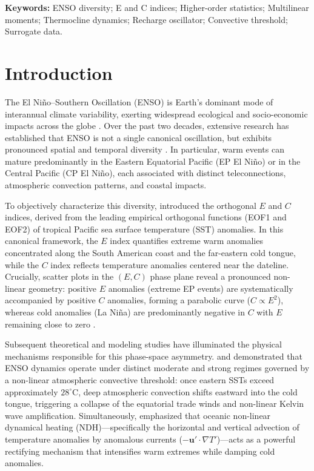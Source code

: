 \documentclass[11pt,a4paper]{article}
\begin{document}
\vspace{0.5em}
\noindent\textbf{Keywords:} ENSO diversity; E and C indices; Higher-order statistics; Multilinear moments; Thermocline dynamics; Recharge oscillator; Convective threshold; Surrogate data.

\vspace{1.0em}

\section{Introduction}

The El Ni\~no--Southern Oscillation (ENSO) is Earth's dominant mode of interannual climate variability, exerting widespread ecological and socio-economic impacts across the globe \citep{rasmusson1982variations, mcphaden1998tropical, cai2021changing}. Over the past two decades, extensive research has established that ENSO is not a single canonical oscillation, but exhibits pronounced spatial and temporal diversity \citep{capotondi2015understanding, timmermann2018enso}. In particular, warm events can mature predominantly in the Eastern Equatorial Pacific (EP El Ni\~no) or in the Central Pacific (CP El Ni\~no), each associated with distinct teleconnections, atmospheric convection patterns, and coastal impacts.

To objectively characterize this diversity, \citet{takahashi2011enso} introduced the orthogonal $E$ and $C$ indices, derived from the leading empirical orthogonal functions (EOF1 and EOF2) of tropical Pacific sea surface temperature (SST) anomalies. In this canonical framework, the $E$ index quantifies extreme warm anomalies concentrated along the South American coast and the far-eastern cold tongue, while the $C$ index reflects temperature anomalies centered near the dateline. Crucially, scatter plots in the $(E, C)$ phase plane reveal a pronounced non-linear geometry: positive $E$ anomalies (extreme EP events) are systematically accompanied by positive $C$ anomalies, forming a parabolic curve ($C \propto E^2$), whereas cold anomalies (La Ni\~na) are predominantly negative in $C$ with $E$ remaining close to zero \citep{takahashi2011enso, karamperidou2014intrinsic}.

Subsequent theoretical and modeling studies have illuminated the physical mechanisms responsible for this phase-space asymmetry. \citet{takahashi2016strong} and \citet{capotondi2020diversity} demonstrated that ENSO dynamics operate under distinct moderate and strong regimes governed by a non-linear atmospheric convective threshold: once eastern SSTs exceed approximately $28^\circ\text{C}$, deep atmospheric convection shifts eastward into the cold tongue, triggering a collapse of the equatorial trade winds and non-linear Kelvin wave amplification. Simultaneously, \citet{an2004nonlinearity} emphasized that oceanic non-linear dynamical heating (NDH)---specifically the horizontal and vertical advection of temperature anomalies by anomalous currents ($-\mathbf{u}' \cdot \nabla T'$)---acts as a powerful rectifying mechanism that intensifies warm extremes while damping cold anomalies.
\end{document}
